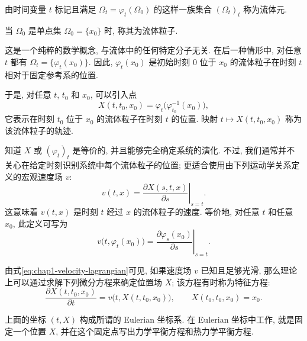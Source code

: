 \begin{Definition}
\label{def:chap1-fluid-element}
由时间变量 $t$ 标记且满足 $\Omega_t=\varphi_t(\Omega_0)$ 的这样一族集合 $(\Omega_t)_t$ 称为流体元.

当 $\Omega_0$ 是单点集 $\Omega_0=\{x_0\}$ 时, 称其为流体粒子.
\end{Definition}

这是一个纯粹的数学概念, 与流体中的任何特定分子无关. 在后一种情形中, 对任意 $t$ 都有 $\Omega_t=\{\varphi_t(x_0)\}$. 因此, $\varphi_t(x_0)$ 是初始时刻 $0$ 位于 $x_0$ 的流体粒子在时刻 $t$ 相对于固定参考系的位置.

于是, 对任意 $t$, $t_0$ 和 $x_0$, 可以引入点
\[
  X(t,t_0,x_0)=\varphi_t\bigl(\varphi_{t_0}^{-1}(x_0)\bigr),
\]
它表示在时刻 $t_0$ 位于 $x_0$ 的流体粒子在时刻 $t$ 的位置. 映射 $t\mapsto X(t,t_0,x_0)$ 称为该流体粒子的轨迹.

知道 $X$ 或 $(\varphi_t)_t$ 是等价的, 并且能够完全确定系统的演化. 不过, 我们通常并不关心在给定时刻识别系统中每个流体粒子的位置; 更适合使用由下列运动学关系定义的宏观速度场 $v$:
\begin{equation}
\label{eq:chap1-velocity-definition}
  v(t,x)=\left.\frac{\partial X(s,t,x)}{\partial s}\right|_{s=t}.
\end{equation}
这意味着 $v(t,x)$ 是时刻 $t$ 经过 $x$ 的流体粒子的速度. 等价地, 对任意 $t$ 和任意 $x_0$, 此定义可写为
\begin{equation}
\label{eq:chap1-velocity-lagrangian}
  v\bigl(t,\varphi_t(x_0)\bigr)
  =\left.\frac{\partial\varphi_s(x_0)}{\partial s}\right|_{s=t}.
\end{equation}

\begin{Remark}
\label{rem:chap1-characteristic-equation}
由式\eqref{eq:chap1-velocity-lagrangian}可见, 如果速度场 $v$ 已知且足够光滑, 那么理论上可以通过求解下列微分方程来确定位置场 $X$; 该方程有时称为特征方程:
\begin{equation}
\label{eq:chap1-characteristic-equation}
  \frac{\partial X(t,t_0,x_0)}{\partial t}
  =v\bigl(t,X(t,t_0,x_0)\bigr),
  \qquad X(t_0,t_0,x_0)=x_0.
\end{equation}
\end{Remark}

上面的坐标 $(t,X)$ 构成所谓的 Eulerian 坐标系. 在 Eulerian 坐标中工作, 就是固定一个位置 $X$, 并在这个固定点写出力学平衡方程和热力学平衡方程.

